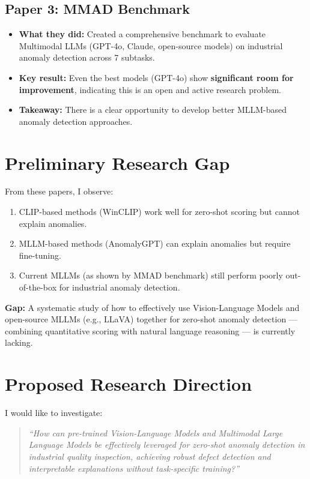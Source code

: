 \documentclass[12pt, a4paper]{article}
\begin{document}
\subsection{Paper 3: MMAD Benchmark \cite{jiang2025mmad}}
\begin{itemize}[leftmargin=*]
    \item \textbf{What they did:} Created a comprehensive benchmark to evaluate Multimodal LLMs (GPT-4o, Claude, open-source models) on industrial anomaly detection across 7 subtasks.
    \item \textbf{Key result:} Even the best models (GPT-4o) show \textbf{significant room for improvement}, indicating this is an open and active research problem.
    \item \textbf{Takeaway:} There is a clear opportunity to develop better MLLM-based anomaly detection approaches.
\end{itemize}

\section{Preliminary Research Gap}

From these papers, I observe:
\begin{enumerate}[leftmargin=*]
    \item CLIP-based methods (WinCLIP) work well for zero-shot scoring but cannot explain anomalies.
    \item MLLM-based methods (AnomalyGPT) can explain anomalies but require fine-tuning.
    \item Current MLLMs (as shown by MMAD benchmark) still perform poorly out-of-the-box for industrial anomaly detection.
\end{enumerate}

\textbf{Gap:} A systematic study of how to effectively use Vision-Language Models and open-source MLLMs (e.g., LLaVA) together for zero-shot anomaly detection --- combining quantitative scoring with natural language reasoning --- is currently lacking.

\section{Proposed Research Direction}

I would like to investigate:

\begin{quote}
\textit{``How can pre-trained Vision-Language Models and Multimodal Large Language Models be effectively leveraged for zero-shot anomaly detection in industrial quality inspection, achieving robust defect detection and interpretable explanations without task-specific training?''}
\end{quote}
\end{document}
